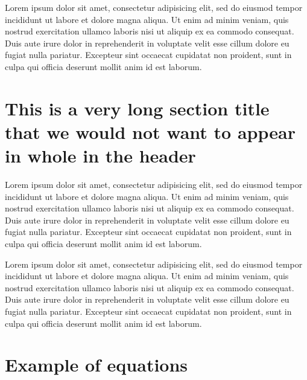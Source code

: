 Lorem ipsum dolor sit amet, consectetur adipisicing elit, sed do eiusmod tempor incididunt ut labore et dolore magna aliqua. Ut enim ad minim veniam,
quis nostrud exercitation ullamco laboris nisi ut aliquip ex ea commodo consequat. Duis aute irure dolor in reprehenderit in voluptate velit esse
cillum dolore eu fugiat nulla pariatur. Excepteur sint occaecat cupidatat non proident, sunt in culpa qui officia deserunt mollit anim id est laborum.

\section[Short section title]{This is a very long section title that we would not want to appear in whole in the header}

Lorem ipsum dolor sit amet, consectetur adipisicing elit, sed do eiusmod tempor incididunt ut labore et dolore magna aliqua. Ut enim ad minim veniam,
quis nostrud exercitation ullamco laboris nisi ut aliquip ex ea commodo consequat. Duis aute irure dolor in reprehenderit in voluptate velit esse
cillum dolore eu fugiat nulla pariatur. Excepteur sint occaecat cupidatat non proident, sunt in culpa qui officia deserunt mollit anim id est laborum.

Lorem ipsum dolor sit amet, consectetur adipisicing elit, sed do eiusmod tempor incididunt ut labore et dolore magna aliqua. Ut enim ad minim veniam,
quis nostrud exercitation ullamco laboris nisi ut aliquip ex ea commodo consequat. Duis aute irure dolor in reprehenderit in voluptate velit esse
cillum dolore eu fugiat nulla pariatur. Excepteur sint occaecat cupidatat non proident, sunt in culpa qui officia deserunt mollit anim id est laborum.

\section{Example of equations}

